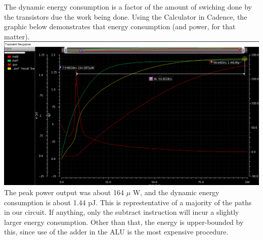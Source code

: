 \documentclass[12pt]{article}
\begin{document}
  The dynamic energy consumption is a factor of the amount of swiching done by the transistors due
  the work being done. Using the Calculator in Cadence, the graphic below demonstrates that energy 
  consumption (and power, for that matter).
  \newline \newline
  \includegraphics[scale=0.4]{energy.png} \\
  \newline \newline
  The peak power output was about 164 $\mu$ W, and the dynamic energy consumption is about 1.44 pJ.
  This is represtentative of a majority of the paths in our circuit. If anything, only the subtract
  instruction will incur a slightly larger energy consumption. Other than that, the energy is upper-bounded
  by this, since use of the adder in the ALU is the most expensive procedure.
    
  
\end{document}
